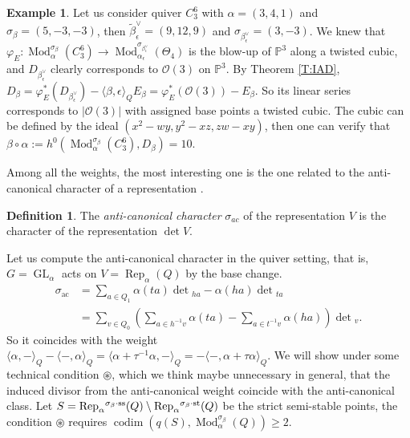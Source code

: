 \documentclass{amsart}
\theoremstyle{definition}
\newtheorem{definition}[theorem]{Definition}
\newtheorem{example}[theorem]{Example}
\theoremstyle{remark}
\numberwithin{equation}{section}
\begin{document}
\begin{example} Let us consider quiver $C_3^6$ with $\alpha=(3,4,1)$ and $\sigma_\beta=(5,-3,-3)$, then $\tilde{\beta}_\epsilon^\vee=(9,12,9)$ and $\sigma_{\beta_\epsilon^\vee}=(3,-3)$. We knew that $\varphi_E:{\operatorname{Mod}}_\alpha^{\sigma_\beta}(C_3^6)\to{\operatorname{Mod}}_{\alpha_\epsilon}^{\sigma_{\beta_\epsilon^\vee}}(\Theta_4)$ is the blow-up of ${\mathbb{{P}}}^3$ along a twisted cubic, and $D_{\beta_\epsilon^\vee}$ clearly corresponds to ${\mathcal{{O}}}(3)$ on ${\mathbb{{P}}}^3$. By Theorem \ref{T:IAD}, $D_\beta=\varphi_E^*(D_{\beta_\epsilon^\vee})-{\langle{\beta,\epsilon}\rangle}_Q E_\beta=\varphi_E^*({\mathcal{{O}}}(3))-E_\beta$. So its linear series corresponds to $|{\mathcal{{O}}}(3)|$ with assigned base points a twisted cubic. The cubic can be defined by the ideal $(x^2-wy,y^2-xz,zw-xy)$, then one can verify that $\beta\circ\alpha:=h^0({\operatorname{Mod}}_\alpha^{\sigma_\beta}(C_3^6),D_\beta)=10$.
\end{example}

Among all the weights, the most interesting one is the one related to the anti-canonical character of a representation \cite{Hal}.

\begin{definition}
The {\em anti-canonical character} $\sigma_{ac}$ of the representation $V$ is the character of the representation $\det V$.
\end{definition}

Let us compute the anti-canonical character in the quiver setting, that is, $G={\operatorname{GL}}_\alpha$ acts on $V={\operatorname{Rep}}_\alpha(Q)$ by the base change.
\begin{align*}
\sigma_{\text{ac}}& =\sum_{a\in Q_1}\alpha(ta)\det{_{ha}}-\alpha(ha)\det{_{ta}}\\
& =\sum_{v\in Q_0}(\sum_{a\in h^{-1}v}\alpha(ta)-\sum_{a\in t^{-1}v}\alpha(ha))\det{_v}.
\end{align*}
So it coincides with the weight ${\langle{\alpha,-}\rangle}_Q-{\langle{-,\alpha}\rangle}_Q={\langle{\alpha+\tau^{-1}\alpha,-}\rangle}_Q=-{\langle{-,\alpha+\tau\alpha}\rangle}_Q$.
We will show under some technical condition $\circledast$, which we think maybe unnecessary in general, that the induced divisor from the anti-canonical weight coincide with the anti-canonical class.
Let $S={\operatorname{Rep}}_\alpha{^{\sigma_{{\beta}}\cdot{\rm {ss}}}}(Q)\setminus{\operatorname{Rep}}_\alpha{^{\sigma_{{\beta}}\cdot{\rm {st}}}}(Q)$ be the strict semi-stable points, the condition $\circledast$ requires ${\operatorname{codim}}(q(S),{\operatorname{Mod}}_\alpha^{\sigma_\beta}(Q))\geqslant 2$.
\end{document}

